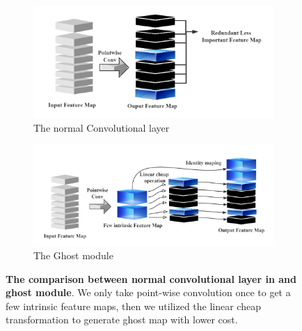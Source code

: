 \begin{figure}[h]
	\begin{center}
		\begin{subfigure}[b]{0.49\textwidth}
			\includegraphics[width=\textwidth]{thesis-template-master/images/normal conv.png}
			\caption{The normal Convolutional layer}
			\label{fig:res18}
		\end{subfigure}
		\begin{subfigure}[b]{0.49\textwidth}
		    \centering
			\includegraphics[width=\textwidth]{thesis-template-master/images/ghostmodule.png}
			\caption{The Ghost module}
			\label{fig:cellnet}
		\end{subfigure}
	\end{center}
	\caption{\textbf{The comparison between normal convolutional layer in \cite{26}\cite{27}\cite{28} and ghost module}. We only take point-wise convolution once to get a few intrinsic feature maps, then we utilized the linear cheap transformation to generate ghost map with lower cost.}
\end{figure}



